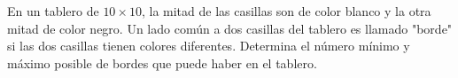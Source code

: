 En un tablero de $10\times 10$, la mitad de las casillas son de color blanco y la otra mitad de color negro. Un lado común a dos casillas del tablero es llamado "borde" si las dos casillas tienen colores diferentes. Determina el número mínimo y máximo posible de bordes que puede haber en el tablero.

